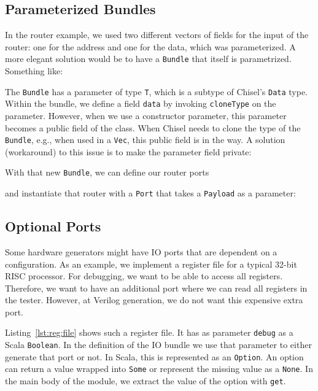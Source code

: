 \documentclass[%
    10pt,
    headinclude, footexclude,
    openright, %
    notitlepage,
    cleardoubleempty,
    headsepline,
    pointlessnumbers,
    bibtotoc, idxtotoc,
    ]{scrbook}
\newcommand{\code}[1]{{\lstinline[basicstyle=\small\ttfamily]{#1}}}
\begin{document}

\subsection{Parameterized Bundles}

In the router example, we used two different vectors of fields for the input
of the router: one for the address and one for the data, which was parameterized.
A more elegant solution would be to have a \code{Bundle} that itself
is parametrized. Something like:


The \code{Bundle} has a parameter of type \code{T}, which is a subtype
of Chisel's \code{Data} type.
Within the bundle, we define a field \code{data} by invoking \code{cloneType}
on the parameter.
However, when we use a constructor parameter, this parameter becomes a
public field of the class. When Chisel needs to clone the type of the \code{Bundle},
e.g., when used in a \code{Vec}, this public field is in the way.
A solution (workaround) to this issue is to make the parameter field private:


\noindent With that new \code{Bundle}, we can define our router ports


\noindent and instantiate that router with a \code{Port} that takes
a \code{Payload} as a parameter:


\subsection{Optional Ports}

Some hardware generators might have IO ports that are dependent on a configuration.
As an example, we implement a register file for a typical 32-bit RISC processor. For debugging,
we want to be able to access all registers. Therefore, we want to have an additional
port where we can read all registers in the tester. However, at Verilog generation,
we do not want this expensive extra port.

Listing~\ref{lst:reg:file} shows such a register file. It has as parameter \code{debug}
as a Scala \code{Boolean}. In the definition of the IO bundle we use that parameter
to either generate that port or not. In Scala, this is represented as an \code{Option}.
An option can return a value wrapped into \code{Some} or represent the missing value
as a \code{None}. In the main body of the module, we extract the value of the option
with \code{get}.
\end{document}
